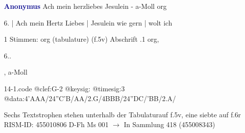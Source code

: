 \documentclass[twocolumn]{book}
\begin{document}
\newline \par \vspace{7pt} \textcolor{darkblue}{\textbf{Anonymus  }}
\newline Ach mein herzliebes Jesulein - a-Moll
\newline org
\newline \begin{itshape}[f.5v, at left:] 6. | Ach mein Hertz Liebes | Jesulein wie gern | wolt ich\end{itshape} 
\newline \textcolor{darkblue}{}  1 Stimmen: org (tabulature)  (f.5v)
\newline Abschrift
.1  org, \begin{itshape}6..\end{itshape}, a-Moll
\newline \begin{footnotesize}  \end{footnotesize}  
\begin{filecontents*}{14-1.code}
@clef:G-2
@keysig:
@timesig:3
@data:4'AAA/24''C'B/AA/2.G/4BBB/24''DC/'BB/2.A/
\end{filecontents*}
\newline
%
\newline Sechs Textstrophen stehen unterhalb der Tabulaturauf f.5v, eine siebte auf f.6r
\newline RISM-ID: 455010806
\newline D-Fh  Ms 001
\newline $\rightarrow$ In Sammlung 418 (455008343)
      
\end{document}
